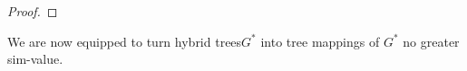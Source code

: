 \documentclass[a4paper,UKenglish,cleveref,hyperref,autoref]{lipics-v2021}
\newcommand{\tmap}{tree mapping\xspace}
\newcommand{\tmaps}{tree mappings\xspace}
\newcommand{\htree}{hybrid tree\xspace}
\newcommand{\htrees}{hybrid trees\xspace}
\begin{document}
\begin{proof}
%
%
\end{proof}

We are now equipped to turn \htrees $G^*$ into \tmaps of $G^*$ no greater sim-value.

\end{document}
